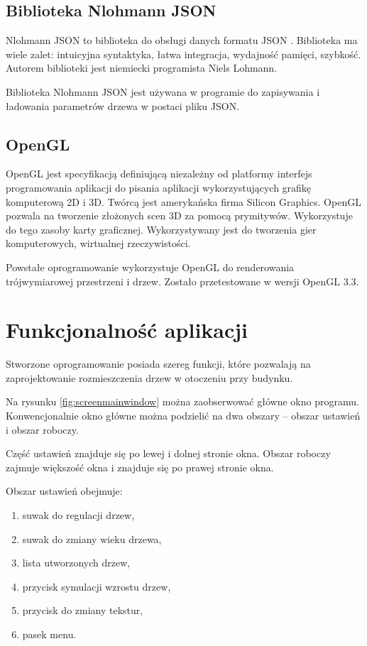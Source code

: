 \documentclass[a4paper,twoside,12pt]{report}
\begin{document}
\subsection{Biblioteka Nlohmann JSON}

Nlohmann JSON to biblioteka do obsługi danych formatu JSON \cite{nlohmannjson}.
Biblioteka ma wiele zalet: intuicyjna syntaktyka, łatwa integracja,
wydajność pamięci, szybkość. Autorem biblioteki jest 
niemiecki programista Niels Lohmann.

Biblioteka Nlohmann JSON jest używana w programie do zapisywania i 
ładowania parametrów drzewa w postaci pliku JSON.

\subsection{OpenGL}

OpenGL jest specyfikacją definiującą niezależny od
platformy interfejs programowania aplikacji do pisania 
aplikacji wykorzystujących grafikę komputerową 2D i 3D. 
Twórcą jest amerykańska firma Silicon Graphics. OpenGL pozwala na tworzenie 
złożonych scen 3D za pomocą prymitywów. Wykorzystuje do tego zasoby 
karty graficznej. Wykorzystywany jest do 
tworzenia gier komputerowych, wirtualnej rzeczywistości.

Powstałe oprogramowanie wykorzystuje OpenGL do renderowania trójwymiarowej 
przestrzeni i drzew. Zostało przetestowane w wersji OpenGL 3.3.

\section{Funkcjonalność aplikacji}

Stworzone oprogramowanie posiada szereg funkcji, które pozwalają na 
zaprojektowanie rozmieszczenia drzew w otoczeniu przy budynku. 

Na rysunku \ref{fig:screenmainwindow} można zaobserwować główne okno programu. 
Konwencjonalnie okno główne można podzielić na dwa obszary -- 
obszar ustawień i obszar roboczy.

Część ustawień znajduje się po lewej i dolnej stronie okna. 
Obszar roboczy zajmuje większość okna i znajduje się po prawej stronie okna.

Obszar ustawień obejmuje:
\begin{enumerate}[label=\arabic*)]
	\item suwak do regulacji drzew,
	\item suwak do zmiany wieku drzewa,
	\item lista utworzonych drzew,
	\item przycisk symulacji wzrostu drzew,
	\item przycisk do zmiany tekstur,
	\item pasek menu.
\end{enumerate}
\end{document}

